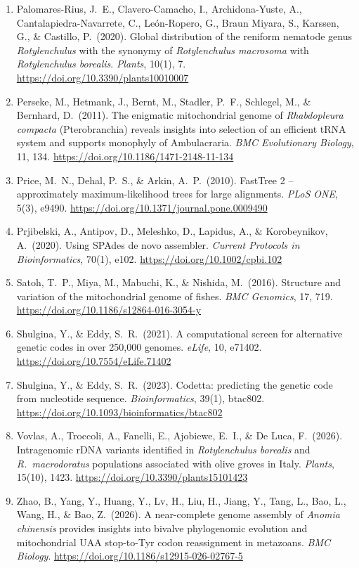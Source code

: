 \documentclass[11pt, a4paper]{article}
\begin{document}
\begin{enumerate}[label={}, leftmargin=1.5em, itemindent=-1.5em, itemsep=0.3em, parsep=0pt]
\item Palomares-Rius, J.\ E., Clavero-Camacho, I., Archidona-Yuste, A., Cantalapiedra-Navarrete, C., León-Ropero, G., Braun Miyara, S., Karssen, G., \& Castillo, P.\ (2020). Global distribution of the reniform nematode genus \textit{Rotylenchulus} with the synonymy of \textit{Rotylenchulus macrosoma} with \textit{Rotylenchulus borealis}. \textit{Plants}, 10(1), 7. \url{https://doi.org/10.3390/plants10010007}
\item Perseke, M., Hetmank, J., Bernt, M., Stadler, P.\ F., Schlegel, M., \& Bernhard, D.\ (2011). The enigmatic mitochondrial genome of \textit{Rhabdopleura compacta} (Pterobranchia) reveals insights into selection of an efficient tRNA system and supports monophyly of Ambulacraria. \textit{BMC Evolutionary Biology}, 11, 134. \url{https://doi.org/10.1186/1471-2148-11-134}
\item Price, M.\ N., Dehal, P.\ S., \& Arkin, A.\ P.\ (2010). FastTree 2 -- approximately maximum-likelihood trees for large alignments. \textit{PLoS ONE}, 5(3), e9490. \url{https://doi.org/10.1371/journal.pone.0009490}
\item Prjibelski, A., Antipov, D., Meleshko, D., Lapidus, A., \& Korobeynikov, A.\ (2020). Using SPAdes de novo assembler. \textit{Current Protocols in Bioinformatics}, 70(1), e102. \url{https://doi.org/10.1002/cpbi.102}
\item Satoh, T.\ P., Miya, M., Mabuchi, K., \& Nishida, M.\ (2016). Structure and variation of the mitochondrial genome of fishes. \textit{BMC Genomics}, 17, 719. \url{https://doi.org/10.1186/s12864-016-3054-y}
\item Shulgina, Y., \& Eddy, S.\ R.\ (2021). A computational screen for alternative genetic codes in over 250,000 genomes. \textit{eLife}, 10, e71402. \url{https://doi.org/10.7554/eLife.71402}
\item Shulgina, Y., \& Eddy, S.\ R.\ (2023). Codetta: predicting the genetic code from nucleotide sequence. \textit{Bioinformatics}, 39(1), btac802. \url{https://doi.org/10.1093/bioinformatics/btac802}
\item Vovlas, A., Troccoli, A., Fanelli, E., Ajobiewe, E.\ I., \& De Luca, F.\ (2026). Intragenomic rDNA variants identified in \textit{Rotylenchulus borealis} and \textit{R.\ macrodoratus} populations associated with olive groves in Italy. \textit{Plants}, 15(10), 1423. \url{https://doi.org/10.3390/plants15101423}
\item Zhao, B., Yang, Y., Huang, Y., Lv, H., Liu, H., Jiang, Y., Tang, L., Bao, L., Wang, H., \& Bao, Z.\ (2026). A near-complete genome assembly of \textit{Anomia chinensis} provides insights into bivalve phylogenomic evolution and mitochondrial UAA stop-to-Tyr codon reassignment in metazoans. \textit{BMC Biology}. \url{https://doi.org/10.1186/s12915-026-02767-5}
\end{enumerate}
\end{document}
